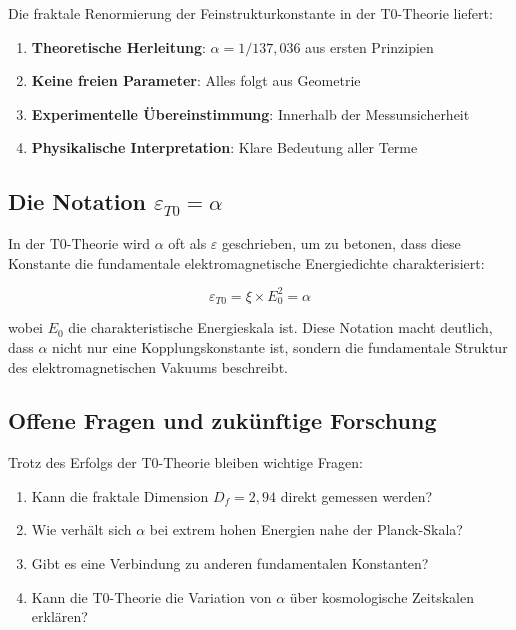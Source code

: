 \documentclass[12pt,a4paper]{article}
\theoremstyle{definition}
\begin{document}
	Die fraktale Renormierung der Feinstrukturkonstante in der T0-Theorie liefert:
	
	\begin{enumerate}
		\item \textbf{Theoretische Herleitung}: $\alpha = 1/137{,}036$ aus ersten Prinzipien
		\item \textbf{Keine freien Parameter}: Alles folgt aus Geometrie
		\item \textbf{Experimentelle Übereinstimmung}: Innerhalb der Messunsicherheit
		\item \textbf{Physikalische Interpretation}: Klare Bedeutung aller Terme
	\end{enumerate}
	
	\subsection{Die Notation $\varepsilon_{T0} = \alpha$}
	
	In der T0-Theorie wird $\alpha$ oft als $\varepsilon$ geschrieben, um zu betonen, dass diese Konstante die fundamentale elektromagnetische Energiedichte charakterisiert:
	
	\begin{equation}
		\varepsilon_{T0} = \xi \times E_0^2 = \alpha
	\end{equation}
	
	wobei $E_0$ die charakteristische Energieskala ist. Diese Notation macht deutlich, dass $\alpha$ nicht nur eine Kopplungskonstante ist, sondern die fundamentale Struktur des elektromagnetischen Vakuums beschreibt.
	
	\subsection{Offene Fragen und zukünftige Forschung}
	
	Trotz des Erfolgs der T0-Theorie bleiben wichtige Fragen:
	
	\begin{enumerate}
		\item Kann die fraktale Dimension $D_f = 2{,}94$ direkt gemessen werden?
		\item Wie verhält sich $\alpha$ bei extrem hohen Energien nahe der Planck-Skala?
		\item Gibt es eine Verbindung zu anderen fundamentalen Konstanten?
		\item Kann die T0-Theorie die Variation von $\alpha$ über kosmologische Zeitskalen erklären?
	\end{enumerate}
	
\end{document}
